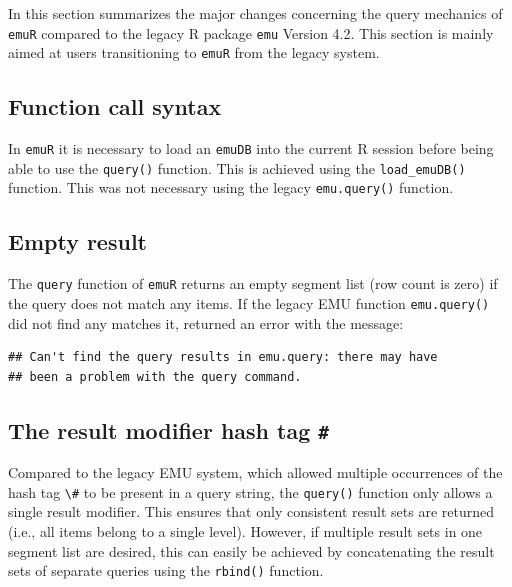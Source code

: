 \documentclass[]{book}
\begin{document}
In this section summarizes the major changes concerning the query mechanics of \texttt{emuR} compared to the legacy R package \texttt{emu} Version 4.2. This section is mainly aimed at users transitioning to \texttt{emuR} from the legacy system.

\hypertarget{function-call-syntax}{%
\subsection{Function call syntax}\label{function-call-syntax}}

In \texttt{emuR} it is necessary to load an \texttt{emuDB} into the current R session before being able to use the \texttt{query()} function. This is achieved using the \texttt{load\_emuDB()} function. This was not necessary using the legacy \texttt{emu.query()} function.

\hypertarget{empty-result}{%
\subsection{Empty result}\label{empty-result}}

The \texttt{query} function of \texttt{emuR} returns an empty segment list (row count is zero) if the query does not match any items. If the legacy EMU function \texttt{emu.query()} did not find any matches it, returned an error with the message:

\begin{verbatim}
## Can't find the query results in emu.query: there may have 
## been a problem with the query command.
\end{verbatim}

\hypertarget{the-result-modifier-hash-tag}{%
\subsection{\texorpdfstring{The result modifier hash tag \texttt{\#}}{The result modifier hash tag \#}}\label{the-result-modifier-hash-tag}}

Compared to the legacy EMU system, which allowed multiple occurrences of the hash tag \texttt{\textbackslash{}\#} to be present in a query string, the \texttt{query()} function only allows a single result modifier. This ensures that only consistent result sets are returned (i.e., all items belong to a single level). However, if multiple result sets in one segment list are desired, this can easily be achieved by concatenating the result sets of separate queries using the \texttt{rbind()} function.
\end{document}

